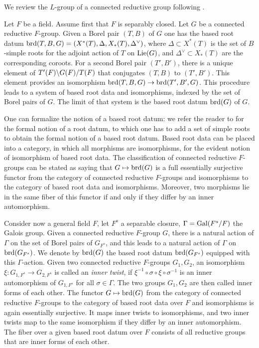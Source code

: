 \documentclass{article}
\theoremstyle{definition}
\numberwithin{equation}{section}
\renewcommand{\-}{\hyp{}}
\begin{document}
We review the $L$\-group of a connected reductive group following \cite[\S2]{Vog93}.

Let $F$ be a field. Assume first that $F$ is separably closed. Let $G$ be a connected reductive $F$-group. Given a Borel pair $(T,B)$ of $G$ one has the based root datum $\textrm{brd}(T,B,G)=(X^*(T),\Delta,X_*(T),\Delta^\vee)$, where $\Delta \subset X^*(T)$ is the set of $B$-simple roots for the adjoint action of $T$ on $\textrm{Lie}(G)$, and $\Delta^\vee \subset X_*(T)$ are the corresponding coroots. For a second Borel pair $(T',B')$, there is a unique element of $T'(F)\backslash G(F)/T(F)$ that conjugates $(T,B)$ to $(T',B')$. This element provides an isomorphism $\textrm{brd}(T,B,G) \to \textrm{brd}(T',B',G)$. This procedure leads to a system of based root data and isomorphisms, indexed by the set of Borel pairs of $G$. The limit of that system is the based root datum $\textrm{brd}(G)$ of $G$.

One can formalize the notion of a based root datum: we refer the reader to \cite[\S7.4]{Spr98} for the formal notion of a root datum, to which one has to add a set of simple roots to obtain the formal notion of a based root datum. Based root data can be placed into a category, in which all morphisms are isomorphisms, for the evident notion of isomorphism of based root data. The classification of connected reductive $F$-groups \cite[Theorem 9.6.2, Theorem 10.1.1]{Spr98} can be stated as saying that $G \mapsto \textrm{brd}(G)$ is a full essentially surjective functor from the category of connected reductive $F$-groups and isomorphisms to the category of based root data and isomorphisms. Moreover, two morphisms lie in the same fiber of this functor if and only if they differ by an inner automorphism.

Consider now a general field $F$, let $F^s$ a separable closure, $\Gamma=\textrm{Gal}(F^s/F)$ the Galois group. Given a connected reductive $F$-group $G$, there is a natural action of $\Gamma$ on the set of Borel pairs of $G_{F^s}$, and this leads to a natural action of $\Gamma$ on $\textrm{brd}(G_{F^s})$. We denote by $\textrm{brd}(G)$ the based root datum $\textrm{brd}(G_{F^s})$ equipped with this $\Gamma$-action. Given two connected reductive $F$-groups $G_1,G_2$, an isomorphism $\xi : G_{1,F^s} \to G_{2,F^s}$ is called an \emph{inner twist}, if $\xi^{-1}\circ\sigma\circ\xi\circ\sigma^{-1}$ is an inner automorphism of $G_{1,F^s}$ for all $\sigma \in \Gamma$. The two groups $G_1,G_2$ are then called inner forms of each other. The functor $G \mapsto \textrm{brd}(G)$ from the category of connected reductive $F$-groups to the category of based root data over $F$ and isomorphisms is again essentially surjective. It maps inner twists to isomorphisms, and two inner twists map to the same isomorphism if they differ by an inner automorphism. The fiber over a given based root datum over $F$ consists of all reductive groups that are inner forms of each other.
\end{document}
